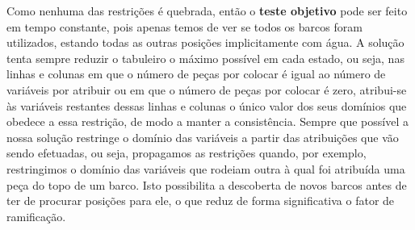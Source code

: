 \documentclass[12pt,a4paper]{article}
\begin{document}
Como nenhuma das restrições é quebrada, então o \textbf{teste objetivo} pode ser feito em tempo constante, pois apenas temos de ver se todos
os barcos foram utilizados, estando todas as outras posições implicitamente com água.
A solução tenta sempre reduzir o tabuleiro o máximo possível em cada estado, ou seja, nas linhas e colunas em que o número de peças por colocar
é igual ao número de variáveis por atribuir ou em que o número de peças por colocar é zero, atribui-se às variáveis restantes dessas
linhas e colunas o único valor dos seus domínios que obedece a essa restrição, de modo a manter a consistência.
Sempre que possível a nossa solução restringe o domínio das variáveis a partir das atribuições que vão sendo efetuadas, ou seja,
propagamos as restrições quando, por exemplo, restringimos o domínio das variáveis que rodeiam outra à qual foi atribuída uma peça do topo de um barco.
Isto possibilita a descoberta de novos barcos antes de ter de procurar posições para ele, o que reduz de forma significativa o fator de ramificação.

\end{document}
